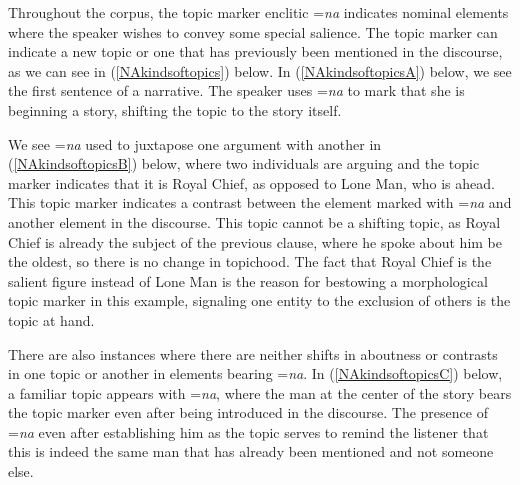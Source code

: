 Throughout the corpus, the topic marker enclitic =\textit{na} indicates nominal elements where the speaker wishes to convey some special salience. The topic marker can indicate a new topic or one that has previously been mentioned in the discourse, as we can see in (\ref{NAkindsoftopics}) below. In (\ref{NAkindsoftopicsA}) below, we see the first sentence of a narrative. The speaker uses =\textit{na} to mark that she is beginning a story, shifting the topic to the story itself. 

We see =\textit{na} used to juxtapose one argument with another in (\ref{NAkindsoftopicsB}) below, where two individuals are arguing and the topic marker indicates that it is Royal Chief, as opposed to Lone Man, who is ahead. This topic marker indicates a contrast between the element marked with =\textit{na} and another element in the discourse. This topic cannot be a shifting topic, as Royal Chief is already the subject of the previous clause, where he spoke about him be the oldest, so there is no change in topichood. The fact that Royal Chief is the salient figure instead of Lone Man is the reason for bestowing a morphological topic marker in this example, signaling one entity to the exclusion of others is the topic at hand.

There are also instances where there are neither shifts in aboutness or contrasts in one topic or another in elements bearing =\textit{na}. In (\ref{NAkindsoftopicsC}) below, a familiar topic appears with =\textit{na}, where the man at the center of the story bears the topic marker even after being introduced in the discourse. The presence of =\textit{na} even after establishing him as the topic serves to remind the listener that this is indeed the same man that has already been mentioned and not someone else.

